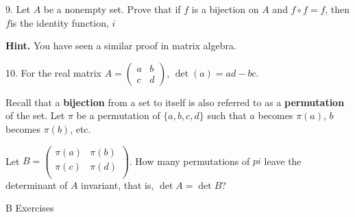 \documentclass[10pt,]{book}
\newcommand{\terminology}[1]{\textbf{#1}}
\theoremstyle{plain}
\theoremstyle{definition}
\theoremstyle{definition}
\theoremstyle{definition}
\begin{document}
\begin{exercisegroup}
\begin{enumerate}[label=\alph*]
\end{enumerate}
%
\par\smallskip
\item[9.]\hypertarget{exercise-31}{} Let \(A\) be a nonempty set. Prove that if \( f \) is a bijection on \(A\) and \(f \circ f=f\), then \( f \)is the identity function, \(i\) %
\par\smallskip
\par\smallskip
\noindent\textbf{Hint.}\hypertarget{hint-1}{}\quad
You have seen a similar proof in matrix algebra.%
\item[10.]\hypertarget{exercise-32}{} For the real matrix \(A=\left(
\begin{array}{cc}
 a & b \\
 c & d 
\end{array}
\right)\), \(\det(a)= a d-b c\).%
\par
Recall that a  \terminology{bijection} from a set to itself is also referred to as a \terminology{permutation} of the set. Let \(\pi\) be a permutation of \(\{a,b,c,d\}\) such that \(a\) becomes \(\pi (a)\), \(b\) becomes \(\pi (b)\), etc.%
\par
Let \(B=\left(
\begin{array}{cc}
 \pi(a)& \pi(b)\\
 \pi(c)& \pi(d)\\
\end{array}
\right)\). How many permutations of \(pi\) leave the determinant of \(A\) invariant, that is, \(\det  A = \det  B\)?%
\par\smallskip
\end{exercisegroup}
\par\smallskip\noindent
\hypertarget{exercisegroup-6}{}\typeout{************************************************}
\typeout{************************************************}
B Exercises%
\end{document}
